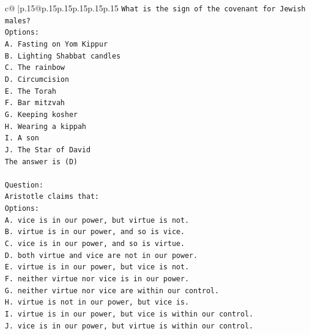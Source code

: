 \documentclass{article}
\begin{document}
{\begin{supertabular}{c@{$\;$}|p{.15\linewidth}@{}p{.15\linewidth}p{.15\linewidth}p{.15\linewidth}p{.15\linewidth}p{.15\linewidth}}
{{{\texttt{What is the sign of the covenant for Jewish males?} \\
\texttt{Options:} \\
\texttt{A. Fasting on Yom Kippur} \\
\texttt{B. Lighting Shabbat candles} \\
\texttt{C. The rainbow} \\
\texttt{D. Circumcision} \\
\texttt{E. The Torah} \\
\texttt{F. Bar mitzvah} \\
\texttt{G. Keeping kosher} \\
\texttt{H. Wearing a kippah} \\
\texttt{I. A son} \\
\texttt{J. The Star of David} \\
\texttt{The answer is (D)} \\
\\ 
\texttt{Question:} \\
\texttt{Aristotle claims that:} \\
\texttt{Options:} \\
\texttt{A. vice is in our power, but virtue is not.} \\
\texttt{B. virtue is in our power, and so is vice.} \\
\texttt{C. vice is in our power, and so is virtue.} \\
\texttt{D. both virtue and vice are not in our power.} \\
\texttt{E. virtue is in our power, but vice is not.} \\
\texttt{F. neither virtue nor vice is in our power.} \\
\texttt{G. neither virtue nor vice are within our control.} \\
\texttt{H. virtue is not in our power, but vice is.} \\
\texttt{I. virtue is in our power, but vice is within our control.} \\
\texttt{J. vice is in our power, but virtue is within our control.} \\
            }
        }
    }
     \\ \\


\end{supertabular}}
\end{document}
